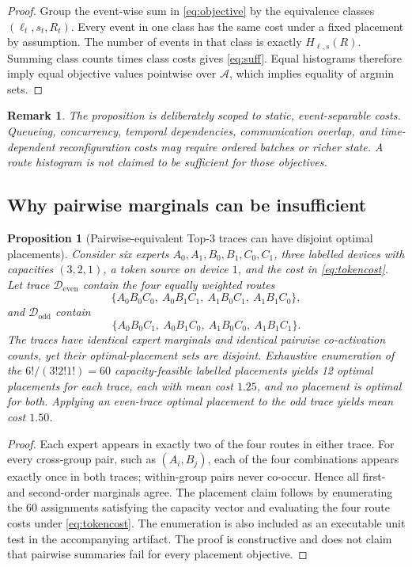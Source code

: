 \documentclass[a4paper,preprint,review,12pt,authoryear]{elsarticle}
\newtheorem{proposition}{Proposition}
\newtheorem{remark}{Remark}
\newcommand{\Dcal}{\mathcal{D}}
\newcommand{\PiSet}{\mathcal{A}}
\begin{document}
\begin{proof}
Group the event-wise sum in \cref{eq:objective} by the equivalence classes $(\ell_t,s_t,R_t)$. Every event in one class has the same cost under a fixed placement by assumption. The number of events in that class is exactly $H_{\ell,s}(R)$. Summing class counts times class costs gives \cref{eq:suff}. Equal histograms therefore imply equal objective values pointwise over $\PiSet$, which implies equality of argmin sets.
\end{proof}

\begin{remark}
The proposition is deliberately scoped to static, event-separable costs. Queueing, concurrency, temporal dependencies, communication overlap, and time-dependent reconfiguration costs may require ordered batches or richer state. A route histogram is not claimed to be sufficient for those objectives.
\end{remark}

\subsection{Why pairwise marginals can be insufficient}

\begin{proposition}[Pairwise-equivalent Top-3 traces can have disjoint optimal placements]
\label{prop:parity}
Consider six experts $A_0,A_1,B_0,B_1,C_0,C_1$, three labelled devices with capacities $(3,2,1)$, a token source on device $1$, and the cost in \cref{eq:tokencost}. Let trace $\Dcal_{\mathrm{even}}$ contain the four equally weighted routes
\begin{equation*}
 \{A_0B_0C_0,\ A_0B_1C_1,\ A_1B_0C_1,\ A_1B_1C_0\},
\end{equation*}
and $\Dcal_{\mathrm{odd}}$ contain
\begin{equation*}
 \{A_0B_0C_1,\ A_0B_1C_0,\ A_1B_0C_0,\ A_1B_1C_1\}.
\end{equation*}
The traces have identical expert marginals and identical pairwise co-activation counts, yet their optimal-placement sets are disjoint. Exhaustive enumeration of the $6!/(3!2!1!)=60$ capacity-feasible labelled placements yields 12 optimal placements for each trace, each with mean cost $1.25$, and no placement is optimal for both. Applying an even-trace optimal placement to the odd trace yields mean cost $1.50$.
\end{proposition}

\begin{proof}
Each expert appears in exactly two of the four routes in either trace. For every cross-group pair, such as $(A_i,B_j)$, each of the four combinations appears exactly once in both traces; within-group pairs never co-occur. Hence all first- and second-order marginals agree. The placement claim follows by enumerating the 60 assignments satisfying the capacity vector and evaluating the four route costs under \cref{eq:tokencost}. The enumeration is also included as an executable unit test in the accompanying artifact. The proof is constructive and does not claim that pairwise summaries fail for every placement objective.
\end{proof}
\end{document}
